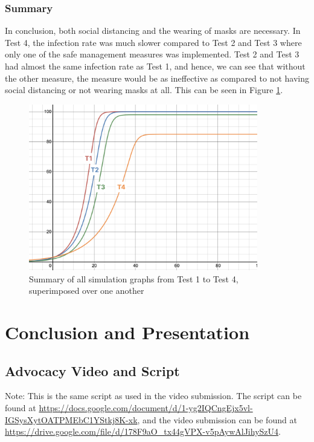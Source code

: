 \documentclass[a4paper,titlepage]{article}
\begin{document}
\subsubsection{Summary}

In conclusion, both social distancing and the wearing of masks are necessary. In Test 4, the infection rate was much slower compared to Test 2 and Test 3 where only one of the safe management measures was implemented. Test 2 and Test 3 had almost the same infection rate as Test 1, and hence, we can see that without the other measure, the measure would be as ineffective as compared to not having social distancing or not wearing masks at all. This can be seen in Figure \ref{fig:simGall}.

\begin{figure}[htbp]
    \centering
    \includegraphics[width=10cm]{simGall.png}
    \caption{Summary of all simulation graphs from Test 1 to Test 4, superimposed over one another}
    \label{fig:simGall}
\end{figure}

\pagebreak
\section{Conclusion and Presentation}

\subsection{Advocacy Video and Script}

Note: This is the same script as used in the video submission. The script can be found at \url{https://docs.google.com/document/d/1-yg2IQCngEjx5vl-IGSysXytOATPMEbC1YStkj8K-xk}, and the video submission can be found at \url{https://drive.google.com/file/d/178F9aO_tx44gVPX-v5pAywAlJihySzU4}.
\end{document}
